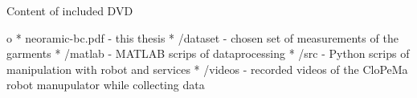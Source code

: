 \app Content of included DVD

\begitems \style o
* neoramic-bc.pdf - this thesis
* /dataset - chosen set of measurements of the garments
* /matlab - MATLAB scrips of dataprocessing
* /src - Python scrips of manipulation with robot and services
* /videos - recorded videos of the CloPeMa robot manupulator while collecting data
\enditems



